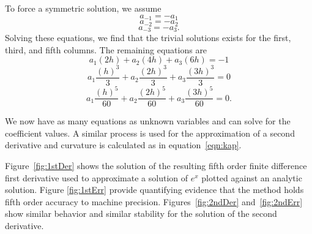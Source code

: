\noindent To force a symmetric solution, we assume 
\begin{equation}
a_{-1} = -a_1
\end{equation}
\begin{equation}
a_{-2} = -a_2
\end{equation}
\begin{equation}
a_{-3} = -a_3 .
\end{equation}
Solving these equations, we find that the trivial solutions exists for the first, third, and fifth columns. The remaining equations are
\begin{equation}
a_1 (2h)+ a_2 (4h)+ a_3 (6h) = -1
\end{equation}
\begin{equation}
a_1 \frac{(h)^3}{3}     +a_2  \frac{(2h)^3}{3}    +a_3 \frac{(3h)^3}{3}     = 0
\end{equation}
\begin{equation}
a_1 \frac{(h)^5}{60}     +a_2  \frac{(2h)^5}{60}    +a_3 \frac{(3h)^5}{60}     = 0.
\end{equation}

\noindent We now have as many equations as unknown variables and can solve for the coefficient values. A similar process is used for the approximation of a second derivative and curvature is calculated as in equation~\ref{eqn:kap}.


Figure~\ref{fig:1stDer} shows the solution of the resulting fifth order finite difference first derivative used to approximate a solution of $e^x$ plotted against an analytic solution.  Figure \ref{fig:1stErr} provide quantifying evidence that the method holds fifth order accuracy to machine precision.  Figures~\ref{fig:2ndDer} and~\ref{fig:2ndErr} show similar behavior and similar stability for the solution of the second derivative. 

